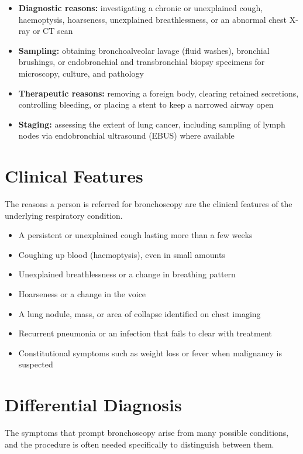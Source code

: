\begin{itemize}
    \item \textbf{Diagnostic reasons:} investigating a chronic or unexplained cough, haemoptysis, hoarseness, unexplained breathlessness, or an abnormal chest X-ray or CT scan
    \item \textbf{Sampling:} obtaining bronchoalveolar lavage (fluid washes), bronchial brushings, or endobronchial and transbronchial biopsy specimens for microscopy, culture, and pathology
    \item \textbf{Therapeutic reasons:} removing a foreign body, clearing retained secretions, controlling bleeding, or placing a stent to keep a narrowed airway open
    \item \textbf{Staging:} assessing the extent of lung cancer, including sampling of lymph nodes via endobronchial ultrasound (EBUS) where available
\end{itemize}

\section*{Clinical Features}
The reasons a person is referred for bronchoscopy are the clinical features of the underlying respiratory condition.

\begin{itemize}
    \item A persistent or unexplained cough lasting more than a few weeks
    \item Coughing up blood (haemoptysis), even in small amounts
    \item Unexplained breathlessness or a change in breathing pattern
    \item Hoarseness or a change in the voice
    \item A lung nodule, mass, or area of collapse identified on chest imaging
    \item Recurrent pneumonia or an infection that fails to clear with treatment
    \item Constitutional symptoms such as weight loss or fever when malignancy is suspected
\end{itemize}

\section*{Differential Diagnosis}
The symptoms that prompt bronchoscopy arise from many possible conditions, and the procedure is often needed specifically to distinguish between them.

